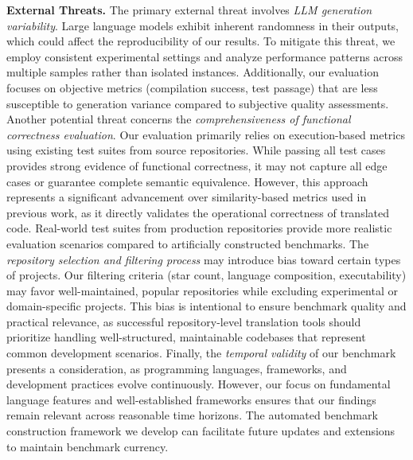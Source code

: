 \noindent \textbf{External Threats.}
The primary external threat involves \textit{LLM generation variability}. Large language models exhibit inherent randomness in their outputs, which could affect the reproducibility of our results. To mitigate this threat, we employ consistent experimental settings and analyze performance patterns across multiple samples rather than isolated instances. Additionally, our evaluation focuses on objective metrics (compilation success, test passage) that are less susceptible to generation variance compared to subjective quality assessments.
Another potential threat concerns the \textit{comprehensiveness of functional correctness evaluation}. Our evaluation primarily relies on execution-based metrics using existing test suites from source repositories. While passing all test cases provides strong evidence of functional correctness, it may not capture all edge cases or guarantee complete semantic equivalence. However, this approach represents a significant advancement over similarity-based metrics used in previous work, as it directly validates the operational correctness of translated code. Real-world test suites from production repositories provide more realistic evaluation scenarios compared to artificially constructed benchmarks.
The \textit{repository selection and filtering process} may introduce bias toward certain types of projects. Our filtering criteria (star count, language composition, executability) may favor well-maintained, popular repositories while excluding experimental or domain-specific projects. This bias is intentional to ensure benchmark quality and practical relevance, as successful repository-level translation tools should prioritize handling well-structured, maintainable codebases that represent common development scenarios.
Finally, the \textit{temporal validity} of our benchmark presents a consideration, as programming languages, frameworks, and development practices evolve continuously. However, our focus on fundamental language features and well-established frameworks ensures that our findings remain relevant across reasonable time horizons. The automated benchmark construction framework we develop can facilitate future updates and extensions to maintain benchmark currency.


